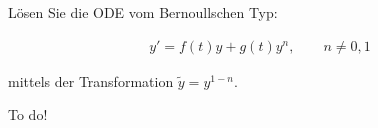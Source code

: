 \begin{exercise}
  Lösen Sie die ODE vom Bernoullschen Typ:

  \begin{align*}
    y' = f(t)y + g(t) y^n , \qquad n \neq 0,1
  \end{align*}

  mittels der Transformation $\tilde{y} = y^{1-n}$.
\end{exercise}

\begin{solution}
  To do!
\end{solution}
